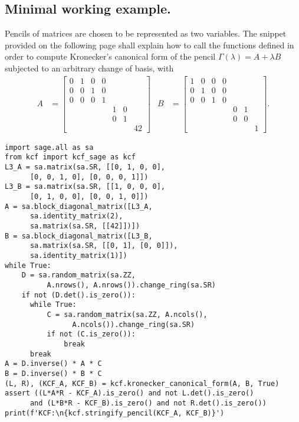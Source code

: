 \subsection*{Minimal working example.}
Pencils of matrices are chosen to be represented as two variables. The snippet provided on the following page
shall explain how to call the functions defined in order to compute Kronecker's canonical form of the pencil
\(\Gamma(\lambda) = A + \lambda B\) subjected to an arbitrary change of basis, with
\begin{align*}
    A &=
    \begin{bmatrix}
        0 & 1 & 0 & 0 \\
        0 & 0 & 1 & 0 \\
        0 & 0 & 0 & 1 \\
        & & & & 1 & 0 \\
        & & & & 0 & 1 \\
        & & & & & & 42
    \end{bmatrix} &
    B &=
    \begin{bmatrix}
        1 & 0 & 0 & 0 \\
        0 & 1 & 0 & 0 \\
        0 & 0 & 1 & 0 \\
        & & & & 0 & 1 \\
        & & & & 0 & 0 \\
        & & & & & & 1
    \end{bmatrix}.
\end{align*}
\pagebreak
\begin{verbatim}
import sage.all as sa
from kcf import kcf_sage as kcf
L3_A = sa.matrix(sa.SR, [[0, 1, 0, 0],
      [0, 0, 1, 0], [0, 0, 0, 1]])
L3_B = sa.matrix(sa.SR, [[1, 0, 0, 0],
      [0, 1, 0, 0], [0, 0, 1, 0]])
A = sa.block_diagonal_matrix([L3_A,
      sa.identity_matrix(2),
      sa.matrix(sa.SR, [[42]])])
B = sa.block_diagonal_matrix([L3_B,
      sa.matrix(sa.SR, [[0, 1], [0, 0]]),
      sa.identity_matrix(1)])
while True:
    D = sa.random_matrix(sa.ZZ,
          A.nrows(), A.nrows()).change_ring(sa.SR)
    if not (D.det().is_zero()):
      while True:
          C = sa.random_matrix(sa.ZZ, A.ncols(),
                A.ncols()).change_ring(sa.SR)
          if not (C.is_zero()):
              break
      break
A = D.inverse() * A * C
B = D.inverse() * B * C
(L, R), (KCF_A, KCF_B) = kcf.kronecker_canonical_form(A, B, True)
assert ((L*A*R - KCF_A).is_zero() and not L.det().is_zero()
      and (L*B*R - KCF_B).is_zero() and not R.det().is_zero())
print(f'KCF:\n{kcf.stringify_pencil(KCF_A, KCF_B)}')
\end{verbatim}
